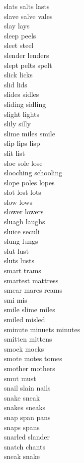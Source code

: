 slats salts lasts\\
slave salve vales\\
slay lays\\
sleep peels\\
sleet steel\\
slender lenders\\
slept pelts spelt\\
slick licks\\
slid lids\\
slides sidles\\
sliding sidling\\
slight lights\\
slily silly\\
slime miles smile\\
slip lips lisp\\
slit list\\
sloe sole lose\\
slooching schooling\\
slope poles lopes\\
slot lost lots\\
slow lows\\
slower lowers\\
sluagh laughs\\
sluice seculi\\
slung lungs\\
slut lust\\
sluts lusts\\
smart trams\\
smartest mattress\\
smear mares reams\\
smi mis\\
smile slime miles\\
smiled misled\\
sminute minuets minutes\\
smitten mittens\\
smock mocks\\
smote motes tomes\\
smother mothers\\
smut must\\
snail slain nails\\
snake sneak\\
snakes sneaks\\
snap span pans\\
snaps spans\\
snarled slander\\
snatch chants\\
sneak snake\\
